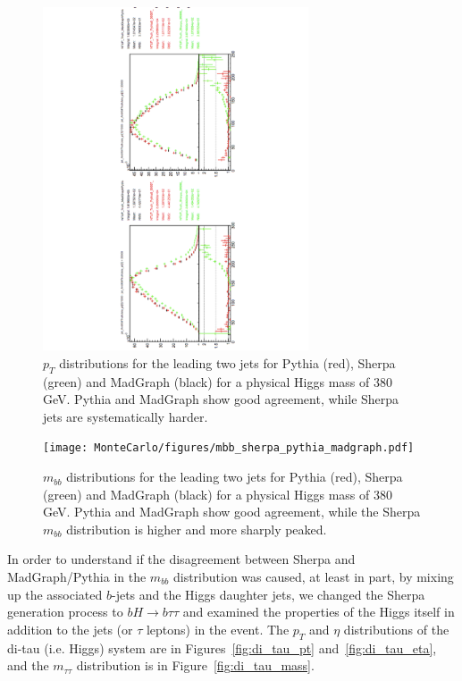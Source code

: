 \begin{figure}
  \center
  \includegraphics[width=0.7\textwidth, angle=270]{MonteCarlo/figures/sig_gen_compare.pdf}
  \caption{$p_T$ distributions for the leading two jets 
  for Pythia (red), Sherpa (green) and MadGraph (black) for a 
  physical Higgs mass of 380 GeV.  
  Pythia and MadGraph show good agreement, while Sherpa jets are systematically harder.  \label{fig:sig_gen_compare}}
\end{figure}
\begin{figure}
  \center
  \texttt{[image: MonteCarlo/figures/mbb\_sherpa\_pythia\_madgraph.pdf]}
  \caption{$m_{bb}$ distributions for the leading two jets 
  for Pythia (red), Sherpa (green) and MadGraph (black) for a physical Higgs mass of 380 GeV.  
  Pythia and MadGraph show good agreement, while the Sherpa $m_{bb}$ distribution is higher and more sharply peaked. 
  \label{fig:mbb_sherpa_pythia_madgraph}}
\end{figure}

In order to understand if the disagreement between Sherpa and MadGraph/Pythia 
in the $m_{bb}$ distribution was caused, at least in part, by
mixing up the associated $b$-jets and the Higgs daughter jets, we changed the Sherpa
generation process to $bH\rightarrow b\tau\tau$ and examined the properties of the
Higgs itself in addition to the jets (or $\tau$ leptons) in the event.  The $p_T$ and 
$\eta$ distributions of the di-tau (i.e. Higgs) system are in Figures~\ref{fig:di_tau_pt}
and~\ref{fig:di_tau_eta}, and the $m_{\tau\tau}$ distribution is in Figure~\ref{fig:di_tau_mass}.



